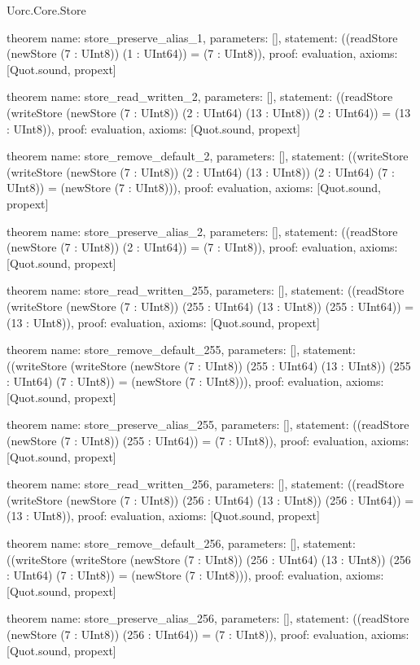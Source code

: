 \begin{lexlean}{Uorc.Core.Store}
\begin{semanticmodule}
theorem{
  name: store_preserve_alias_1,
  parameters: [],
  statement: ((readStore (newStore (7 : UInt8)) (1 : UInt64)) = (7 : UInt8)),
  proof: evaluation{},
  axioms: [Quot.sound, propext]
}

theorem{
  name: store_read_written_2,
  parameters: [],
  statement: ((readStore (writeStore (newStore (7 : UInt8)) (2 : UInt64) (13 : UInt8)) (2 : UInt64)) = (13 : UInt8)),
  proof: evaluation{},
  axioms: [Quot.sound, propext]
}

theorem{
  name: store_remove_default_2,
  parameters: [],
  statement: ((writeStore (writeStore (newStore (7 : UInt8)) (2 : UInt64) (13 : UInt8)) (2 : UInt64) (7 : UInt8)) = (newStore (7 : UInt8))),
  proof: evaluation{},
  axioms: [Quot.sound, propext]
}

theorem{
  name: store_preserve_alias_2,
  parameters: [],
  statement: ((readStore (newStore (7 : UInt8)) (2 : UInt64)) = (7 : UInt8)),
  proof: evaluation{},
  axioms: [Quot.sound, propext]
}

theorem{
  name: store_read_written_255,
  parameters: [],
  statement: ((readStore (writeStore (newStore (7 : UInt8)) (255 : UInt64) (13 : UInt8)) (255 : UInt64)) = (13 : UInt8)),
  proof: evaluation{},
  axioms: [Quot.sound, propext]
}

theorem{
  name: store_remove_default_255,
  parameters: [],
  statement: ((writeStore (writeStore (newStore (7 : UInt8)) (255 : UInt64) (13 : UInt8)) (255 : UInt64) (7 : UInt8)) = (newStore (7 : UInt8))),
  proof: evaluation{},
  axioms: [Quot.sound, propext]
}

theorem{
  name: store_preserve_alias_255,
  parameters: [],
  statement: ((readStore (newStore (7 : UInt8)) (255 : UInt64)) = (7 : UInt8)),
  proof: evaluation{},
  axioms: [Quot.sound, propext]
}

theorem{
  name: store_read_written_256,
  parameters: [],
  statement: ((readStore (writeStore (newStore (7 : UInt8)) (256 : UInt64) (13 : UInt8)) (256 : UInt64)) = (13 : UInt8)),
  proof: evaluation{},
  axioms: [Quot.sound, propext]
}

theorem{
  name: store_remove_default_256,
  parameters: [],
  statement: ((writeStore (writeStore (newStore (7 : UInt8)) (256 : UInt64) (13 : UInt8)) (256 : UInt64) (7 : UInt8)) = (newStore (7 : UInt8))),
  proof: evaluation{},
  axioms: [Quot.sound, propext]
}

theorem{
  name: store_preserve_alias_256,
  parameters: [],
  statement: ((readStore (newStore (7 : UInt8)) (256 : UInt64)) = (7 : UInt8)),
  proof: evaluation{},
  axioms: [Quot.sound, propext]
}


\end{semanticmodule}
\end{lexlean}

